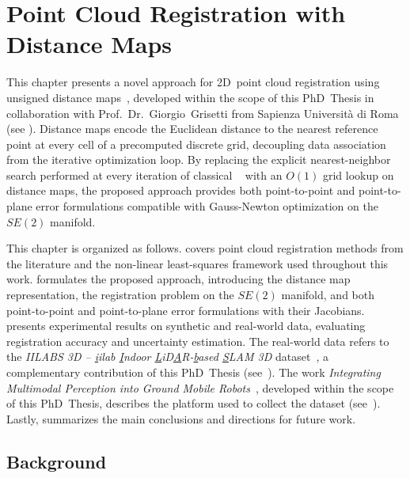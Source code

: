 \chapter{Point Cloud Registration with Distance Maps}\label{chap:distance-maps}

This chapter presents a novel approach for 2D~point cloud registration
using unsigned distance maps~\cite{sousa:robot:2026}, developed within the scope
of this PhD~Thesis in collaboration with Prof.~Dr.~Giorgio~Grisetti from
Sapienza Università di Roma (see ).
Distance maps encode the Euclidean distance to the nearest reference point
at every cell of a precomputed discrete grid, decoupling data association
from the iterative optimization loop.
By replacing the explicit nearest-neighbor search performed at every
iteration of classical
~\cite{besl-mckay:tpami:1992,chen-medioni:icra:1991}
with an $O(1)$ grid lookup on distance maps,
the proposed approach provides both point-to-point and point-to-plane error
formulations compatible with Gauss-Newton optimization on the $SE(2)$ manifold.

This chapter is organized as follows. 
covers point cloud registration methods from the literature and
the non-linear least-squares framework used throughout this work.
 formulates the proposed approach,
introducing the distance map representation,
the registration problem on the $SE(2)$ manifold, and both
point-to-point and point-to-plane error formulations with their Jacobians.
 presents experimental results on
synthetic and real-world data, evaluating registration accuracy and
uncertainty estimation.
The real-world data refers to the
\emph{IILABS 3D -- \underline{i}ilab \underline{I}ndoor
\underline{L}iD\underline{A}R-\underline{b}ased \underline{S}LAM 3D}
dataset~\cite{ribeiro:access:2025}, a complementary contribution of this
PhD~Thesis (see~).
The work \emph{Integrating Multimodal Perception into Ground
Mobile Robots}~\cite{sousa:icarsc:2025}, developed within the scope of this
PhD~Thesis, describes the platform used to collect the dataset
(see~).
Lastly,  summarizes the main
conclusions and directions for future work.

\section{Background}\label{sec:distance-maps:background}

